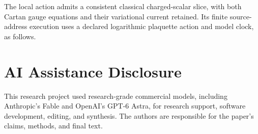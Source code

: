 \documentclass[11pt]{article}
\begin{document}

The local action admits a consistent classical charged-scalar slice, with
both Cartan gauge equations and their variational current retained. Its
finite source-address execution uses a declared logarithmic plaquette
action and model clock, as follows.







\def\OPHPriorWorkBibitems{tex_fragments/PRIOR_WORK_DERIVING_STANDARD_MODEL_GAUGE_STRUCTURE_FROM_OBSERVER_OVERLAP_CONSISTENCY_BIBITEMS.tex}
\def\OPHStandardModelDerivationPaper{1}


\section*{AI Assistance Disclosure}
This research project used research-grade commercial models, including
Anthropic's Fable and OpenAI's GPT-6 Astra, for research support, software
development, editing, and synthesis. The authors are responsible for the
paper's claims, methods, and final text.
\end{document}
